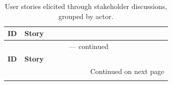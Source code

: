 \begingroup
\small
\begin{longtable}{@{} p{0.10\linewidth} p{0.87\linewidth} @{}}
\caption{User stories elicited through stakeholder discussions, grouped by actor.}
\label{tab:us} \\
\toprule
\textbf{ID} & \textbf{Story} \\
\midrule
\endfirsthead

\multicolumn{2}{c}{\tablename~\thetable{} --- continued} \\
\toprule
\textbf{ID} & \textbf{Story} \\
\midrule
\endhead

\midrule
\multicolumn{2}{r}{\footnotesize Continued on next page} \\
\endfoot

\bottomrule
\endlastfoot


\end{longtable}
